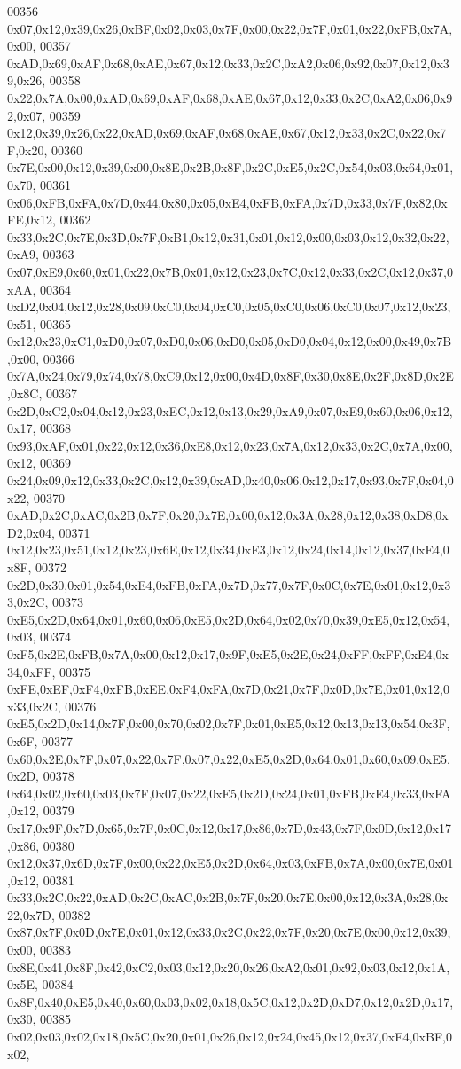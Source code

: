 \begin{DoxyCode}
00356 0x07,0x12,0x39,0x26,0xBF,0x02,0x03,0x7F,0x00,0x22,0x7F,0x01,0x22,0xFB,0x7A,0x00,
00357 0xAD,0x69,0xAF,0x68,0xAE,0x67,0x12,0x33,0x2C,0xA2,0x06,0x92,0x07,0x12,0x39,0x26,
00358 0x22,0x7A,0x00,0xAD,0x69,0xAF,0x68,0xAE,0x67,0x12,0x33,0x2C,0xA2,0x06,0x92,0x07,
00359 0x12,0x39,0x26,0x22,0xAD,0x69,0xAF,0x68,0xAE,0x67,0x12,0x33,0x2C,0x22,0x7F,0x20,
00360 0x7E,0x00,0x12,0x39,0x00,0x8E,0x2B,0x8F,0x2C,0xE5,0x2C,0x54,0x03,0x64,0x01,0x70,
00361 0x06,0xFB,0xFA,0x7D,0x44,0x80,0x05,0xE4,0xFB,0xFA,0x7D,0x33,0x7F,0x82,0xFE,0x12,
00362 0x33,0x2C,0x7E,0x3D,0x7F,0xB1,0x12,0x31,0x01,0x12,0x00,0x03,0x12,0x32,0x22,0xA9,
00363 0x07,0xE9,0x60,0x01,0x22,0x7B,0x01,0x12,0x23,0x7C,0x12,0x33,0x2C,0x12,0x37,0xAA,
00364 0xD2,0x04,0x12,0x28,0x09,0xC0,0x04,0xC0,0x05,0xC0,0x06,0xC0,0x07,0x12,0x23,0x51,
00365 0x12,0x23,0xC1,0xD0,0x07,0xD0,0x06,0xD0,0x05,0xD0,0x04,0x12,0x00,0x49,0x7B,0x00,
00366 0x7A,0x24,0x79,0x74,0x78,0xC9,0x12,0x00,0x4D,0x8F,0x30,0x8E,0x2F,0x8D,0x2E,0x8C,
00367 0x2D,0xC2,0x04,0x12,0x23,0xEC,0x12,0x13,0x29,0xA9,0x07,0xE9,0x60,0x06,0x12,0x17,
00368 0x93,0xAF,0x01,0x22,0x12,0x36,0xE8,0x12,0x23,0x7A,0x12,0x33,0x2C,0x7A,0x00,0x12,
00369 0x24,0x09,0x12,0x33,0x2C,0x12,0x39,0xAD,0x40,0x06,0x12,0x17,0x93,0x7F,0x04,0x22,
00370 0xAD,0x2C,0xAC,0x2B,0x7F,0x20,0x7E,0x00,0x12,0x3A,0x28,0x12,0x38,0xD8,0xD2,0x04,
00371 0x12,0x23,0x51,0x12,0x23,0x6E,0x12,0x34,0xE3,0x12,0x24,0x14,0x12,0x37,0xE4,0x8F,
00372 0x2D,0x30,0x01,0x54,0xE4,0xFB,0xFA,0x7D,0x77,0x7F,0x0C,0x7E,0x01,0x12,0x33,0x2C,
00373 0xE5,0x2D,0x64,0x01,0x60,0x06,0xE5,0x2D,0x64,0x02,0x70,0x39,0xE5,0x12,0x54,0x03,
00374 0xF5,0x2E,0xFB,0x7A,0x00,0x12,0x17,0x9F,0xE5,0x2E,0x24,0xFF,0xFF,0xE4,0x34,0xFF,
00375 0xFE,0xEF,0xF4,0xFB,0xEE,0xF4,0xFA,0x7D,0x21,0x7F,0x0D,0x7E,0x01,0x12,0x33,0x2C,
00376 0xE5,0x2D,0x14,0x7F,0x00,0x70,0x02,0x7F,0x01,0xE5,0x12,0x13,0x13,0x54,0x3F,0x6F,
00377 0x60,0x2E,0x7F,0x07,0x22,0x7F,0x07,0x22,0xE5,0x2D,0x64,0x01,0x60,0x09,0xE5,0x2D,
00378 0x64,0x02,0x60,0x03,0x7F,0x07,0x22,0xE5,0x2D,0x24,0x01,0xFB,0xE4,0x33,0xFA,0x12,
00379 0x17,0x9F,0x7D,0x65,0x7F,0x0C,0x12,0x17,0x86,0x7D,0x43,0x7F,0x0D,0x12,0x17,0x86,
00380 0x12,0x37,0x6D,0x7F,0x00,0x22,0xE5,0x2D,0x64,0x03,0xFB,0x7A,0x00,0x7E,0x01,0x12,
00381 0x33,0x2C,0x22,0xAD,0x2C,0xAC,0x2B,0x7F,0x20,0x7E,0x00,0x12,0x3A,0x28,0x22,0x7D,
00382 0x87,0x7F,0x0D,0x7E,0x01,0x12,0x33,0x2C,0x22,0x7F,0x20,0x7E,0x00,0x12,0x39,0x00,
00383 0x8E,0x41,0x8F,0x42,0xC2,0x03,0x12,0x20,0x26,0xA2,0x01,0x92,0x03,0x12,0x1A,0x5E,
00384 0x8F,0x40,0xE5,0x40,0x60,0x03,0x02,0x18,0x5C,0x12,0x2D,0xD7,0x12,0x2D,0x17,0x30,
00385 0x02,0x03,0x02,0x18,0x5C,0x20,0x01,0x26,0x12,0x24,0x45,0x12,0x37,0xE4,0xBF,0x02,

\end{DoxyCode}
